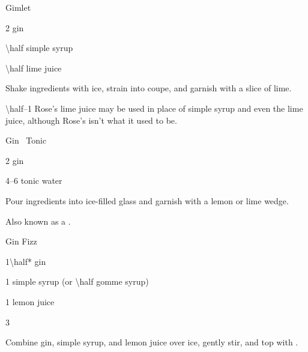 \begin{Cocktail}{Gimlet}
	\begin{Ingredients}
	\item \SI{2}{\oz} gin
	\item \SI{\half}{\oz} simple syrup
	\item \SI{\half}{\oz} lime juice
	\end{Ingredients}
	
	\begin{Instructions}
	Shake ingredients with ice, strain into coupe, and garnish with a slice of lime.
	
	\SIrange{\half}{1}{\oz} Rose's lime juice may be used in place of simple syrup and even the lime juice, although Rose's isn't what it used to be.
	\end{Instructions}
\end{Cocktail}

\begin{Cocktail}{Gin \And\ Tonic}
	\begin{Ingredients}
	\item \SI{2}{\oz} gin
	\item \SIrange{4}{6}{\oz} tonic water
	\end{Ingredients}
	
	\begin{Instructions}
	Pour ingredients into ice-filled glass and garnish with a lemon or lime wedge.
	
	Also known as a \InlineCocktail*{G\&T}.
	\end{Instructions}
\end{Cocktail}

\begin{Cocktail}{Gin Fizz}
	\begin{Ingredients}
	\item \SI{1\half*}{\oz} gin
	\item \SI{1}{\oz} simple syrup (or \SI{\half}{\oz} gomme syrup)
	\item \SI{1}{\oz} lemon juice
	\item \SI{3}{\oz} \soda
	\end{Ingredients}
	
	\begin{Instructions}
	Combine gin, simple syrup, and lemon juice over ice, gently stir, and top with \soda.
	\end{Instructions}
\end{Cocktail}

